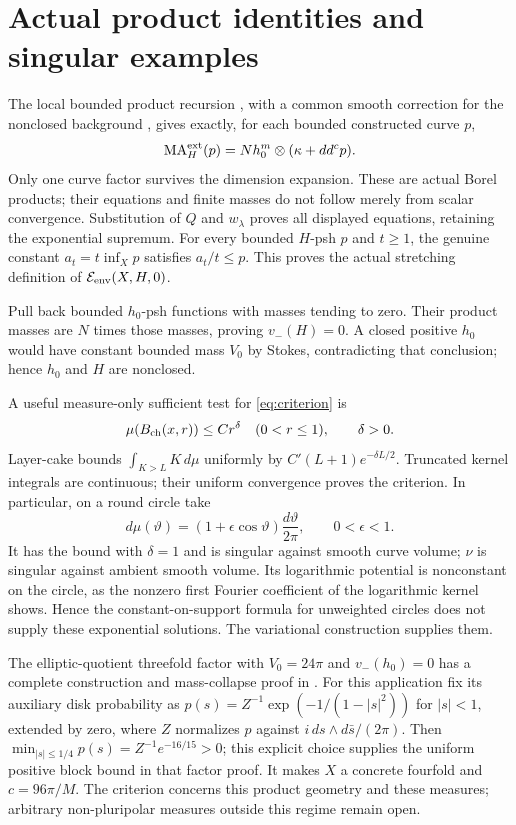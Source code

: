 \documentclass[11pt]{article}
\newcommand{\ddc}{dd^c}
\newcommand{\MA}{\operatorname{MA}}
\newcommand{\Eenv}{\mathcal E_{\rm env}}
\theoremstyle{remark}\newtheorem{remark}[theorem]{Remark}
\begin{document}
\section{Actual product identities and singular examples}
The local bounded product recursion \cite[equation (2.1) and Corollary 2.2]{BT}, with a
common smooth correction for the nonclosed background
\cite[Section 2.1]{BGL}, gives exactly, for each bounded constructed curve $p$,
\[
 \MA_H^{\rm ext}(p)=N h_0^m\otimes(\kappa+\ddc p).
\]
Only one curve factor survives the dimension expansion. These are
actual Borel products; their equations and finite masses do not follow
merely from scalar convergence. Substitution of $Q$ and $w_\lambda$
proves all displayed equations, retaining the exponential supremum.
For every bounded $H$-psh $p$ and $t\geq1$, the genuine constant
$a_t=t\inf_Xp$ satisfies $a_t/t\leq p$. This proves the actual
stretching definition of $\Eenv(X,H,0)$.

Pull back bounded $h_0$-psh functions with masses tending to zero.
Their product masses are $N$ times those masses, proving $v_-(H)=0$.
A closed positive $h_0$ would have constant bounded mass $V_0$ by
Stokes, contradicting that conclusion; hence $h_0$ and $H$ are nonclosed.

A useful measure-only sufficient test for \eqref{eq:criterion} is
\[
 \mu(B_{\rm ch}(x,r))\leq C r^\delta
 \quad(0<r\leq1),\qquad \delta>0.
\]
Layer-cake bounds $\int_{K>L}K\,d\mu$ uniformly by
$C'(L+1)e^{-\delta L/2}$. Truncated kernel integrals are continuous;
their uniform convergence proves the criterion. In particular, on a
round circle take
\[
 d\mu(\vartheta)=(1+\epsilon\cos\vartheta)
                   \frac{d\vartheta}{2\pi},\qquad0<\epsilon<1.
\]
It has the bound with $\delta=1$ and is singular against smooth curve
volume; $\nu$ is singular against ambient smooth volume. Its logarithmic
potential is nonconstant on the circle, as the nonzero first Fourier
coefficient of the logarithmic kernel shows. Hence the constant-on-support
formula for unweighted circles does not supply these exponential solutions.
The variational construction supplies them.

The elliptic-quotient threefold factor with $V_0=24\pi$ and $v_-(h_0)=0$
has a complete construction and mass-collapse proof in \cite{Product}.
For this application fix its auxiliary disk probability as
$p(s)=Z^{-1}\exp(-1/(1-|s|^2))$ for $|s|<1$, extended by zero,
where $Z$ normalizes $p$ against $i\,ds\wedge d\bar s/(2\pi)$.
Then $\min_{|s|\leq1/4}p(s)=Z^{-1}e^{-16/15}>0$; this explicit
choice supplies the uniform positive block bound in that factor proof.
It makes $X$ a concrete fourfold and $c=96\pi/M$. The criterion concerns
this product geometry and these measures; arbitrary non-pluripolar
measures outside this regime remain open.
\end{document}
